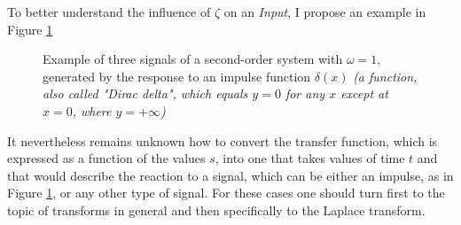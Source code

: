 \documentclass[a4paper, 10pt, final]{article} %
\newcommand{\parenciteit}[2]{\textit{\parencite[#1]{#2}}} %
\begin{document}
    \begin{samepage}
        \noindent To better understand the influence of $\zeta$ on an \emph{Input}, I propose an example in Figure \ref{fig:ExampleDampingAndFrequencyDifference}
        \begin{figure}[H]
            \centering
            \caption{Example of three signals of a second-order system with $\omega=1$, generated by the response to an impulse function $\delta(x)$ \emph{(a function, also called "Dirac delta", which equals $y = 0$ for any $x$ except at $x = 0$, where $y = +\infty$)} \parenciteit{}{Impulse:Wiki}}
            \label{fig:ExampleDampingAndFrequencyDifference}
        \end{figure}
    \end{samepage}

    It nevertheless remains unknown how to convert the transfer function, which is expressed as a function of the values $s$, into one that takes values of time $t$ and that would describe the reaction to a signal, which can be either an impulse, as in Figure \ref{fig:ExampleDampingAndFrequencyDifference}, or any other type of signal.
    For these cases one should turn first to the topic of transforms in general and then specifically to the Laplace transform.
\end{document}
